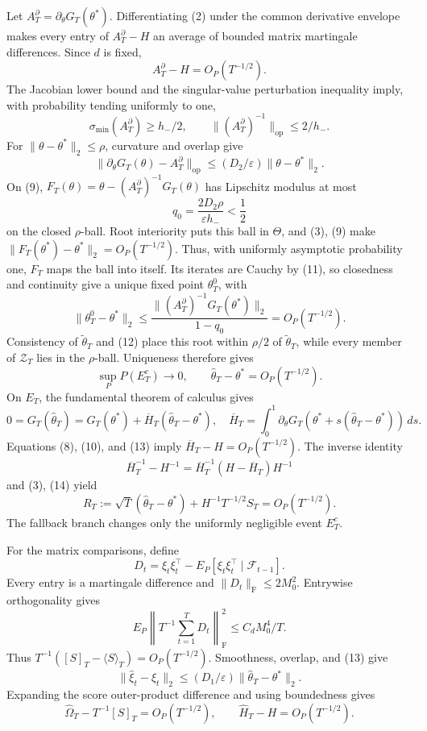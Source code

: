 Let \(A_T^\partial=\partial_\theta G_T(\theta^*)\). Differentiating (2) under the common derivative envelope makes every entry of \(A_T^\partial-H\) an average of bounded matrix martingale differences. Since \(d\) is fixed,
\[
 A_T^\partial-H=O_P(T^{-1/2}).
\tag{8}
\]
The Jacobian lower bound and the singular-value perturbation inequality imply, with probability tending uniformly to one,
\[
 \sigma_{\min}(A_T^\partial)\ge h_-/2,
 \qquad \|(A_T^\partial)^{-1}\|_{\mathrm{op}}\le2/h_-.
\tag{9}
\]
For \(\|\theta-\theta^*\|_2\le\rho\), curvature and overlap give
\[
 \|\partial_\theta G_T(\theta)-A_T^\partial\|_{\mathrm{op}}
 \le(D_2/\varepsilon)\|\theta-\theta^*\|_2.
\tag{10}
\]
On (9), \(F_T(\theta)=\theta-(A_T^\partial)^{-1}G_T(\theta)\) has Lipschitz modulus at most
\[
 q_0=\frac{2D_2\rho}{\varepsilon h_-}<\frac12
\tag{11}
\]
on the closed \(\rho\)-ball. Root interiority puts this ball in \(\Theta\), and (3), (9) make \(\|F_T(\theta^*)-\theta^*\|_2=O_P(T^{-1/2})\). Thus, with uniformly asymptotic probability one, \(F_T\) maps the ball into itself. Its iterates are Cauchy by (11), so closedness and continuity give a unique fixed point \(\theta_T^0\), with
\[
 \|\theta_T^0-\theta^*\|_2
 \le\frac{\|(A_T^\partial)^{-1}G_T(\theta^*)\|_2}{1-q_0}
 =O_P(T^{-1/2}).
\tag{12}
\]
Consistency of \(\widetilde\theta_T\) and (12) place this root within \(\rho/2\) of \(\widetilde\theta_T\), while every member of \(\mathcal Z_T\) lies in the \(\rho\)-ball. Uniqueness therefore gives
\[
 \sup_P P(E_T^c)\longrightarrow0,
 \qquad \widehat\theta_T-\theta^*=O_P(T^{-1/2}).
\tag{13}
\]
On \(E_T\), the fundamental theorem of calculus gives
\[
 0=G_T(\widehat\theta_T)=G_T(\theta^*)+\overline H_T
 (\widehat\theta_T-\theta^*),
 \quad
 \overline H_T=\int_0^1\partial_\theta G_T
 (\theta^*+s(\widehat\theta_T-\theta^*))\,ds.
\tag{14}
\]
Equations (8), (10), and (13) imply \(\overline H_T-H=O_P(T^{-1/2})\). The inverse identity
\[
 \overline H_T^{-1}-H^{-1}
 =\overline H_T^{-1}(H-\overline H_T)H^{-1}
\tag{15}
\]
and (3), (14) yield
\[
 R_T:=\sqrt T(\widehat\theta_T-\theta^*)
 +H^{-1}T^{-1/2}S_T=O_P(T^{-1/2}).
\tag{16}
\]
The fallback branch changes only the uniformly negligible event \(E_T^c\).

For the matrix comparisons, define
\[
 D_t=\xi_t\xi_t^\top-E_P[\xi_t\xi_t^\top\mid\mathcal F_{t-1}].
\tag{17}
\]
Every entry is a martingale difference and \(\|D_t\|_{\mathrm F}\le2M_0^2\). Entrywise orthogonality gives
\[
 E_P\left\|T^{-1}\sum_{t=1}^TD_t\right\|_{\mathrm F}^2
 \le C_dM_0^4/T.
\tag{18}
\]
Thus \(T^{-1}([S]_T-\langle S\rangle_T)=O_P(T^{-1/2})\). Smoothness, overlap, and (13) give
\[
 \|\widehat\xi_t-\xi_t\|_2
 \le(D_1/\varepsilon)\|\widehat\theta_T-\theta^*\|_2.
\tag{19}
\]
Expanding the score outer-product difference and using boundedness gives
\[
 \widehat\Omega_T-T^{-1}[S]_T=O_P(T^{-1/2}),
 \qquad \widehat H_T-H=O_P(T^{-1/2}).
\tag{20}
\]

